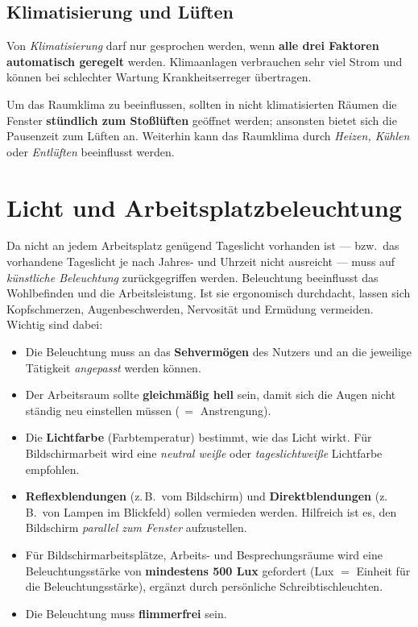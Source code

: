 \documentclass[11pt, a4paper]{article}
\begin{document}
\subsection{Klimatisierung und Lüften}

Von \emph{Klimatisierung} darf nur gesprochen werden, wenn \textbf{alle drei Faktoren
automatisch geregelt} werden. Klimaanlagen verbrauchen sehr viel Strom und können bei
schlechter Wartung Krankheitserreger übertragen.

\begin{merksatz}
Um das Raumklima zu beeinflussen, sollten in nicht klimatisierten Räumen die Fenster
\textbf{stündlich zum Stoßlüften} geöffnet werden; ansonsten bietet sich die Pausenzeit
zum Lüften an. Weiterhin kann das Raumklima durch \emph{Heizen, Kühlen} oder
\emph{Entlüften} beeinflusst werden.
\end{merksatz}

\section{Licht und Arbeitsplatzbeleuchtung}

Da nicht an jedem Arbeitsplatz genügend Tageslicht vorhanden ist --- bzw.\ das
vorhandene Tageslicht je nach Jahres- und Uhrzeit nicht ausreicht --- muss auf
\emph{künstliche Beleuchtung} zurückgegriffen werden. Beleuchtung beeinflusst das
Wohlbefinden und die Arbeitsleistung. Ist sie ergonomisch durchdacht, lassen sich
Kopfschmerzen, Augenbeschwerden, Nervosität und Ermüdung vermeiden. Wichtig sind dabei:

\begin{itemize}
  \item Die Beleuchtung muss an das \textbf{Sehvermögen} des Nutzers und an die jeweilige
    Tätigkeit \emph{angepasst} werden können.
  \item Der Arbeitsraum sollte \textbf{gleichmäßig hell} sein, damit sich die Augen nicht
    ständig neu einstellen müssen (\,$=$ Anstrengung).
  \item Die \textbf{Lichtfarbe} (Farbtemperatur) bestimmt, wie das Licht wirkt. Für
    Bildschirmarbeit wird eine \emph{neutral weiße} oder \emph{tageslichtweiße} Lichtfarbe
    empfohlen.
  \item \textbf{Reflexblendungen} (z.\,B.\ vom Bildschirm) und \textbf{Direktblendungen}
    (z.\,B.\ von Lampen im Blickfeld) sollen vermieden werden. Hilfreich ist es, den
    Bildschirm \emph{parallel zum Fenster} aufzustellen.
  \item Für Bildschirmarbeitsplätze, Arbeits- und Besprechungsräume wird eine
    Beleuchtungsstärke von \textbf{mindestens 500 Lux} gefordert (Lux $=$ Einheit für die
    Beleuchtungsstärke), ergänzt durch persönliche Schreibtischleuchten.
  \item Die Beleuchtung muss \textbf{flimmerfrei} sein.
\end{itemize}
\end{document}
